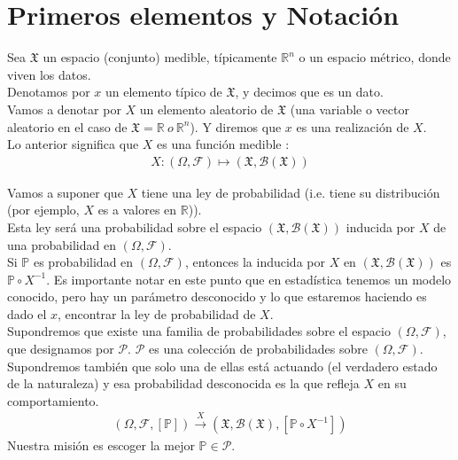 \documentclass[10pt]{article}
\theoremstyle{plain}
\theoremstyle{definition}
\begin{document}
\section{Primeros elementos y Notación}
Sea $\mathfrak{X}$ un espacio (conjunto) medible, típicamente $\mathbb{R}^n$ o un espacio métrico, donde viven los datos.\\
Denotamos por $x$ un elemento típico de $\mathfrak{X}$, y decimos que es un dato.\\
Vamos a denotar por $X$ un elemento aleatorio de $\mathfrak{X}$ (una variable o vector aleatorio en el caso de $\mathfrak{X} = \mathbb{R}\ o\ \mathbb{R}^n$). Y diremos que $x$ es una realización de $X$.\\
Lo anterior significa que $X$ es una función medible :
\begin{align*}
X \colon (\Omega, \mathcal{F}) \mapsto (\mathfrak{X}, \mathcal{B}(\mathfrak{X}))
\end{align*}

Vamos a suponer que $X$ tiene una ley de probabilidad (i.e. tiene su distribución (por ejemplo, $X$ es a valores en $\mathbb{R}$)).\\
Esta ley será una probabilidad  sobre el espacio $(\mathfrak{X}, \mathcal{B}(\mathfrak{X}))$ inducida por $X$ de una probabilidad en $(\Omega, \mathcal{F})$.\\

Si $\mathbb{P}$ es probabilidad  en $(\Omega, \mathcal{F})$, entonces la inducida por $X$ en $(\mathfrak{X}, \mathcal{B}(\mathfrak{X}))$ es $\mathbb{P} \circ X^{-1}$. Es importante notar en este punto que en estadística tenemos un modelo conocido, pero hay un parámetro desconocido y lo que estaremos haciendo es dado el $x$, encontrar la ley de probabilidad de $X$.\\

Supondremos que existe una familia de probabilidades sobre el espacio $(\Omega, \mathcal{F})$, que designamos por $\mathcal{P}$. $\mathcal{P}$ es una colección de probabilidades sobre  $(\Omega, \mathcal{F})$.\\

Supondremos también que solo una de ellas está actuando (el verdadero estado de la naturaleza) y esa probabilidad desconocida es la que refleja $X$ en su comportamiento.\\

\begin{align*}
(\Omega, \mathcal{F}, \left[\mathbb{P}\right]) \xrightarrow{X} (\mathfrak{X}, \mathcal{B}(\mathfrak{X}), \left[\mathbb{P} \circ X^{-1}\right])
\end{align*}
Nuestra misión es escoger la mejor $\mathbb{P} \in \mathcal{P}$.\\
\end{document}
